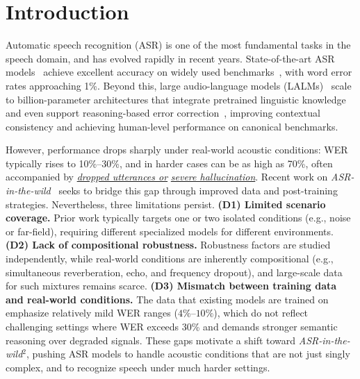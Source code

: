 \documentclass{article}
\begin{document}
\section{Introduction}
\vspace{-1mm}
Automatic speech recognition (ASR) is one of the most fundamental tasks in the speech domain, and has evolved rapidly in recent years. State-of-the-art ASR models~\citep{qwen3-asr,fireredasr2s,paraformer} achieve excellent accuracy on widely used benchmarks~\citep{librispeech}, with word error rates approaching 1\%. Beyond this, large audio-language models (LALMs)~\citep{qwen3-omni,Kimi-Audio} scale to billion-parameter architectures that integrate pretrained linguistic knowledge and even support reasoning-based error correction~\citep{reasoningforasr}, improving contextual consistency and achieving human-level performance on canonical benchmarks.
\vspace{-0.5mm}



However, performance drops sharply under real-world acoustic conditions: WER typically rises to 10\%--30\%, and in harder cases can be as high as 
70\%, often accompanied by \underline{\textit{dropped utterances or}} \underline{\textit{severe hallucination}}. Recent work on \emph{ASR-in-the-wild}~\citep{yan2025improving,asrinthewild} seeks to bridge this gap through improved data and post-training strategies. Nevertheless, three limitations persist.
\textbf{(D1) Limited scenario coverage.} Prior work typically targets one or two isolated conditions (e.g., noise or far-field), requiring different specialized models for different environments. 
\textbf{(D2) Lack of compositional robustness.} Robustness factors are studied independently, while real-world conditions are inherently compositional (e.g., simultaneous reverberation, echo, and frequency dropout), and large-scale data for such mixtures remains scarce. 
\textbf{(D3) Mismatch between training data and real-world conditions.} The data that existing models are trained on emphasize relatively mild WER ranges ($4\%$--$10\%$), which do not reflect challenging settings where WER exceeds 30\% and demands stronger semantic reasoning over degraded signals. These gaps motivate a shift toward \emph{ASR-in-the-wild$^2$}, pushing ASR models to handle acoustic conditions that are not just singly complex, and to recognize speech under much harder settings.
\vspace{-0.5mm}
\end{document}
